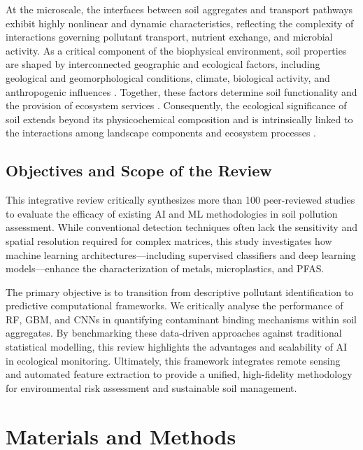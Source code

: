\documentclass[land,article,submit,pdftex,moreauthors]{Definitions/mdpi}
\begin{document}
At the microscale, the interfaces between soil aggregates and transport
pathways exhibit highly nonlinear and dynamic characteristics, reflecting the
complexity of interactions governing pollutant transport, nutrient exchange,
and microbial activity. As a critical component of the biophysical environment,
soil properties are shaped by interconnected geographic and ecological factors,
including geological and geomorphological conditions, climate, biological
activity, and anthropogenic influences \cite{Brevik2015,Amundson2019}.
Together, these factors determine soil functionality and the provision of
ecosystem services \cite{Baveye2016,Klaucol2013,Klaucol2017,Lemenkova2023}.
Consequently, the ecological significance of soil extends beyond its
physicochemical composition and is intrinsically linked to the interactions
among landscape components and ecosystem processes \cite{Lemenkova2025a}.

\subsection{Objectives and Scope of the Review}\label{sec1.3}

This integrative review critically synthesizes more than 100 peer-reviewed
studies to evaluate the efficacy of existing AI and ML methodologies in soil
pollution assessment. While conventional detection techniques often lack the
sensitivity and spatial resolution required for complex matrices, this study
investigates how machine learning architectures---including supervised
classifiers and deep learning models---enhance the characterization of metals,
microplastics, and PFAS.

The primary objective is to transition from descriptive pollutant
identification to predictive computational frameworks. We critically analyse
the performance of RF, GBM, and CNNs in quantifying contaminant binding
mechanisms within soil aggregates. By benchmarking these data-driven
approaches against traditional statistical modelling, this review highlights
the advantages and scalability of AI in ecological monitoring. Ultimately,
this framework integrates remote sensing and automated feature extraction to
provide a unified, high-fidelity methodology for environmental risk assessment
and sustainable soil management.

\section{Materials and Methods}\label{sec2}
\end{document}
